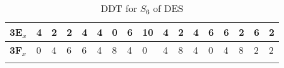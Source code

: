\begin{longtable}[c]{|l|l|l|l|l|l|l|l|l|l|l|l|l|l|l|l|l|}
\textbf{3E$_x$} & 4              & 2              & 2              & 4              & 4              & 0              & 6              & 10             & 4              & 2              & 4              & 6              & 6              & 2              & 6              & 2              \\ \hline
\textbf{3F$_x$} & 0              & 4              & 6              & 6              & 4              & 8              & 4              & 0              & 4              & 8              & 4              & 0              & 4              & 8              & 2              & 2              \\ \hline
\caption{DDT for $S_6$ of DES}
\label{tab:ddt-s6-des}
\end{longtable}